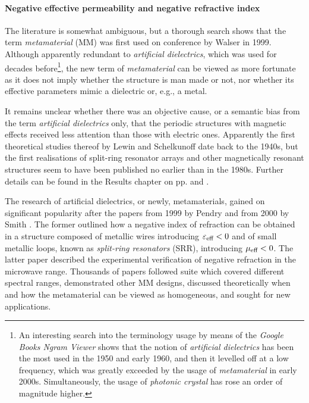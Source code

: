 \paragraph{Negative effective permeability and negative refractive index}  %
The literature is somewhat ambiguous, but a thorough search shows that the term \textit{metamaterial} (MM) was first used on conference by Walser in 1999. Although apparently redundant to \textit{artificial dielectrics}, which was used for decades before\footnote{An interesting search into the terminology usage by means of the \textit{Google Books Ngram Viewer} shows that the notion of  \textit{artificial dielectrics} has been the most used in the 1950 and early 1960, and then it levelled off at a low frequency, which was greatly exceeded by the usage of \textit{metamaterial} in early 2000s. Simultaneously, the usage of \textit{photonic crystal} has rose an order of magnitude higher.},  the new term of \textit{metamaterial} can be viewed as more fortunate as it does not imply whether the structure is man made or not, nor whether its effective parameters mimic a dielectric or, e.g., a metal.

It remains unclear whether there was an objective cause, or a semantic bias from the term \textit{artificial dielectrics} only, that the periodic structures with magnetic effects received less attention than those with electric ones. Apparently the first theoretical studies thereof by Lewin \cite{lewin1947electrical} and Schelkunoff \cite{schelkunoff1952antennas} date back to the 1940s, but the first realisations of split-ring resonator arrays and other magnetically resonant structures seem to have been published no earlier than in the 1980s. Further details can be found in the Results chapter on pp. \pageref{negn_srr} and \pageref{negn_diel}.

The research of artificial dielectrics, or newly, metamaterials, gained on significant popularity after the papers from 1999 by Pendry \cite{pendry1999magnetism} and from 2000 by Smith \cite{smith2000composite}. The former outlined how a negative index of refraction can be obtained in a structure composed of metallic wires introducing $\varepsilon_{\text{eff} }<0$ and of small metallic loops, known as \textit{split-ring resonators} (SRR), introducing $\mu_{\text{eff} }<0$. The latter paper described the experimental verification of negative refraction in the microwave range. Thousands of papers followed suite which covered different spectral ranges, demonstrated other MM designs, discussed theoretically when and how the metamaterial can be viewed as homogeneous, and sought for new applications. 

